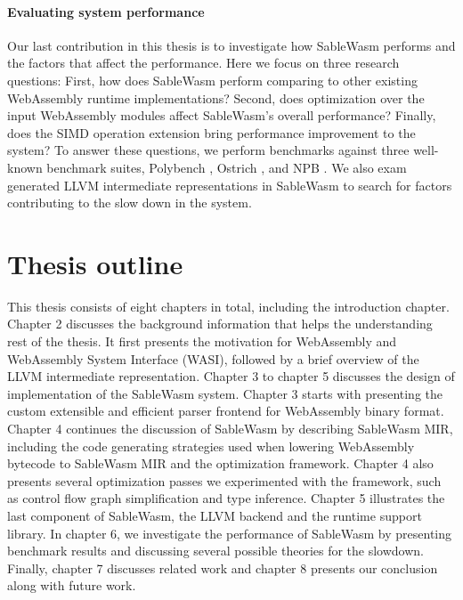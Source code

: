 \paragraph{Evaluating system performance}
Our last contribution in this thesis is to investigate how SableWasm performs
and the factors that affect the performance. Here we focus on three research
questions: First, how does SableWasm perform comparing to other existing
WebAssembly runtime implementations? Second, does optimization over the input
WebAssembly modules affect SableWasm's overall performance? Finally, does the
SIMD operation extension bring performance improvement to the system? To answer
these questions, we perform benchmarks against three well-known benchmark
suites, Polybench \cite{polybench}, Ostrich \cite{ostrich}, and NPB \cite{npb}.
We also exam generated LLVM intermediate representations in SableWasm to search
for factors contributing to the slow down in the system.

\section{Thesis outline}

This thesis consists of eight chapters in total, including the introduction
chapter. Chapter 2 discusses the background information that helps the
understanding rest of the thesis. It first presents the motivation for
WebAssembly and WebAssembly System Interface (WASI), followed by a brief
overview of the LLVM intermediate representation. Chapter 3 to chapter 5
discusses the design of implementation of the SableWasm system. Chapter 3 starts
with presenting the custom extensible and efficient parser frontend for
WebAssembly binary format. Chapter 4 continues the discussion of SableWasm by
describing SableWasm MIR, including the code generating strategies used when
lowering WebAssembly bytecode to SableWasm MIR and the optimization framework.
Chapter 4 also presents several optimization passes we experimented with the
framework, such as control flow graph simplification and type inference.
Chapter 5 illustrates the last component of SableWasm, the LLVM backend and the
runtime support library. In chapter 6, we investigate the performance of
SableWasm by presenting benchmark results and discussing several possible
theories for the slowdown. Finally, chapter 7 discusses related work and
chapter 8 presents our conclusion along with future work.